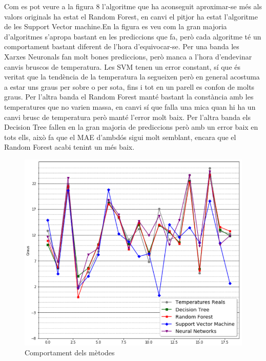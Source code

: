 \documentclass[10pt,a4paper,twocolumn,twoside]{article}
\begin{document}
Com es pot veure a la figura 8 l'algoritme que ha aconseguit aproximar-se més als valors originals ha estat el Random Forest, en canvi el pitjor ha estat l'algoritme de les Support Vector machine.En la figura es veu com la gran majoria d'algoritmes s'apropa bastant en les prediccions que fa, però cada algoritme té un comportament bastant diferent de l'hora d'equivocar-se. Per una banda les Xarxes Neuronals fan molt bones prediccions, però manca a l'hora d'endevinar canvis bruscos de temperatura. Les SVM tenen un error constant, sí que és veritat que la tendència de la temperatura la segueixen però en general acostuma a estar uns graus per sobre o per sota, fins i tot en un parell es confon de molts graus.
Per l'altra banda el Random Forest manté bastant la constància amb les temperatures que no varien massa, en canvi sí que falla una mica quan hi ha un canvi brusc de temperatura però manté l'error molt baix. Per l'altra banda els Decision Tree fallen en la gran majoria de prediccions però amb un error baix en tots ells, això fa que el MAE d'ambdós sigui molt semblant, encara que el Random Forest acabi tenint un més baix.

\begin{figure}[!h]
\centering
	\includegraphics[scale=0.4,center]{../img/comparacioAlgs}
	\caption{Comportament dels mètodes}
	\label{fig-temps}
\end{figure}
\end{document}
